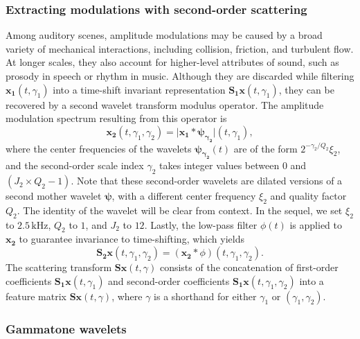\subsubsection{Extracting modulations with second-order scattering}

Among auditory scenes, amplitude modulations may be caused by a broad variety of mechanical interactions, including collision, friction, and turbulent flow.
At longer scales, they also account for higher-level attributes of sound, such as prosody in speech or rhythm in music.
Although they are discarded while filtering $\boldsymbol{x_1}(t,\gamma_1)$ into a time-shift invariant representation $\mathbf{S_1}\boldsymbol{x}(t,\gamma_1)$, they can be recovered by a second wavelet transform modulus operator.
The amplitude modulation spectrum resulting from this operator is
\begin{equation}
\boldsymbol{x_2}(t,\gamma_1,\gamma_2) =
\vert \boldsymbol{x_1} \ast \boldsymbol{\psi_{\gamma_2}} \vert(t,\gamma_1),
\end{equation}
where the center frequencies of the wavelets $\boldsymbol{\psi_{\gamma_2}}(t)$ are of the form $2^{-\gamma_2/Q_2} \xi_2$, and the second-order scale index $\gamma_2$ takes integer values between $0$ and $(J_2 \times Q_2 - 1)$. Note that these second-order wavelets are dilated versions of a second mother wavelet $\boldsymbol{\psi}$, with a different center frequency $\xi_2$ and quality factor $Q_2$. The identity of the wavelet will be clear from context.
In the sequel, we set $\xi_2$ to $2.5\,\mathrm{kHz}$, $Q_2$ to $1$, and $J_2$ to $12$. Lastly, the low-pass filter $\phi(t)$ is applied to $\boldsymbol{x_2}$ to guarantee invariance to time-shifting, which yields
\begin{equation}
\mathbf{S_2}\boldsymbol{x}(t,\gamma_1,\gamma_2) =
(\boldsymbol{x_2} \ast \phi)(t,\gamma_1,\gamma_2).
\end{equation}
The scattering transform $\mathbf{S}\boldsymbol{x}(t,\gamma)$ consists of the concatenation of first-order coefficients $\mathbf{S_1}\boldsymbol{x}(t,\gamma_1)$ and second-order coefficients $\mathbf{S_1}\boldsymbol{x}(t,\gamma_1,\gamma_2)$ into a feature matrix $\mathbf{S}\boldsymbol{x}(t,\gamma)$, where $\gamma$ is a shorthand for either $\gamma_1$ or $(\gamma_1,\gamma_2)$.

\subsubsection{Gammatone wavelets}
%

